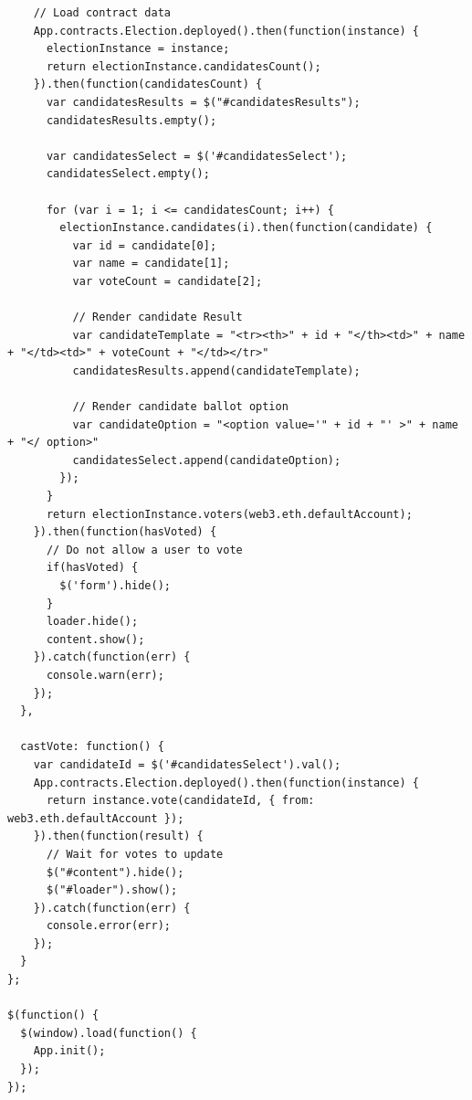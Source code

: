 \documentclass{article}
\begin{document}
\begin{enumerate}
\begin{verbatim}
    // Load contract data
    App.contracts.Election.deployed().then(function(instance) {
      electionInstance = instance;
      return electionInstance.candidatesCount();
    }).then(function(candidatesCount) {
      var candidatesResults = $("#candidatesResults");
      candidatesResults.empty();

      var candidatesSelect = $('#candidatesSelect');
      candidatesSelect.empty();

      for (var i = 1; i <= candidatesCount; i++) {
        electionInstance.candidates(i).then(function(candidate) {
          var id = candidate[0];
          var name = candidate[1];
          var voteCount = candidate[2];

          // Render candidate Result
          var candidateTemplate = "<tr><th>" + id + "</th><td>" + name + "</td><td>" + voteCount + "</td></tr>"
          candidatesResults.append(candidateTemplate);

          // Render candidate ballot option
          var candidateOption = "<option value='" + id + "' >" + name + "</ option>"
          candidatesSelect.append(candidateOption);
        });
      }
      return electionInstance.voters(web3.eth.defaultAccount);
    }).then(function(hasVoted) {
      // Do not allow a user to vote
      if(hasVoted) {
        $('form').hide();
      }
      loader.hide();
      content.show();
    }).catch(function(err) {
      console.warn(err);
    });
  },

  castVote: function() {
    var candidateId = $('#candidatesSelect').val();
    App.contracts.Election.deployed().then(function(instance) {
      return instance.vote(candidateId, { from: web3.eth.defaultAccount });
    }).then(function(result) {
      // Wait for votes to update
      $("#content").hide();
      $("#loader").show();
    }).catch(function(err) {
      console.error(err);
    });
  }
};

$(function() {
  $(window).load(function() {
    App.init();
  });
});
      
\end{verbatim}
  
\end{enumerate}
\end{document}
